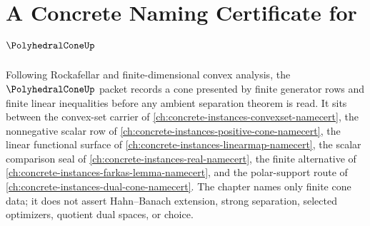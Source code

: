\chapter{A Concrete Naming Certificate for $\PolyhedralConeUp$}
\label{ch:concrete-instances-polyhedral-cone-namecert}

Following Rockafellar and finite-dimensional convex analysis, the $\PolyhedralConeUp$ packet records a cone presented by finite generator rows and finite linear inequalities before any ambient separation theorem is read. It sits between the convex-set carrier of \autoref{ch:concrete-instances-convexset-namecert}, the nonnegative scalar row of \autoref{ch:concrete-instances-positive-cone-namecert}, the linear functional surface of \autoref{ch:concrete-instances-linearmap-namecert}, the scalar comparison seal of \autoref{ch:concrete-instances-real-namecert}, the finite alternative of \autoref{ch:concrete-instances-farkas-lemma-namecert}, and the polar-support route of \autoref{ch:concrete-instances-dual-cone-namecert}. The chapter names only finite cone data; it does not assert Hahn--Banach extension, strong separation, selected optimizers, quotient dual spaces, or choice.


